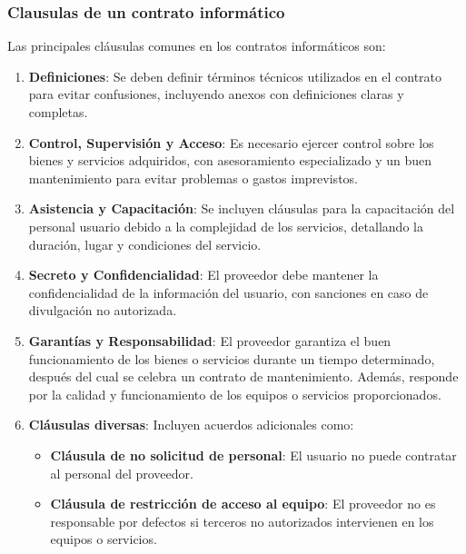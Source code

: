 \documentclass{templateNote}
\begin{document}
\subsubsection*{Clausulas de un contrato informático}
Las principales cláusulas comunes en los contratos informáticos son:
\begin{enumerate}
    \item \textbf{Definiciones}: Se deben definir términos técnicos utilizados en el contrato para evitar confusiones, incluyendo anexos con definiciones claras y completas.
    \item \textbf{Control, Supervisión y Acceso}: Es necesario ejercer control sobre los bienes y servicios adquiridos, con asesoramiento especializado y un buen mantenimiento para evitar problemas o gastos imprevistos.
    \item \textbf{Asistencia y Capacitación}: Se incluyen cláusulas para la capacitación del personal usuario debido a la complejidad de los servicios, detallando la duración, lugar y condiciones del servicio.
    \item \textbf{Secreto y Confidencialidad}: El proveedor debe mantener la confidencialidad de la información del usuario, con sanciones en caso de divulgación no autorizada.
    \item \textbf{Garantías y Responsabilidad}: El proveedor garantiza el buen funcionamiento de los bienes o servicios durante un tiempo determinado, después del cual se celebra un contrato de mantenimiento. Además, responde por la calidad y funcionamiento de los equipos o servicios proporcionados.
    \item \textbf{Cláusulas diversas}: Incluyen acuerdos adicionales como:
    \begin{itemize}
        \item \textbf{Cláusula de no solicitud de personal}: El usuario no puede contratar al personal del proveedor.
        \item \textbf{Cláusula de restricción de acceso al equipo}: El proveedor no es responsable por defectos si terceros no autorizados intervienen en los equipos o servicios.
    \end{itemize}
\end{enumerate}
\end{document}

